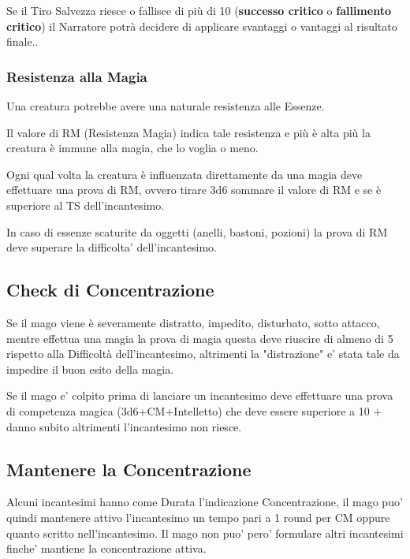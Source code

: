 \begin{multicols}{2}
Se il Tiro Salvezza riesce o fallisce di più di 10 (\textbf{successo critico} o \textbf{fallimento critico}) il Narratore potrà decidere di applicare svantaggi o vantaggi al risultato finale..

\subsubsection{Resistenza alla Magia}

Una creatura potrebbe avere una naturale resistenza alle Essenze.

Il valore di RM (Resistenza Magia) indica tale resistenza e più è alta più la creatura è immune alla magia, che lo voglia o meno.

Ogni qual volta la creatura è influenzata direttamente da una magia deve effettuare una prova di RM, ovvero tirare 3d6 sommare il valore di RM e se è superiore al TS dell'incantesimo.

In caso di essenze scaturite da oggetti (anelli, bastoni, pozioni) la prova di RM deve superare la difficolta' dell'incantesimo.

\subsection{Check di Concentrazione}

Se il mago viene è severamente distratto, impedito, disturbato, sotto attacco, mentre effettua una magia la prova di magia questa deve riuscire di almeno di 5 rispetto alla Difficoltà dell'incantesimo, altrimenti la "distrazione" e' stata tale da impedire il buon esito della magia.

Se il mago e' colpito prima di lanciare un incantesimo deve effettuare una prova di competenza magica (3d6+CM+Intelletto) che deve essere superiore a 10 + danno subito altrimenti l'incantesimo non riesce.

\subsection{Mantenere la Concentrazione}

Alcuni incantesimi hanno come Durata l'indicazione Concentrazione, il mago puo' quindi mantenere attivo l'incantesimo un tempo pari a 1 round per CM oppure quanto scritto nell'incantesimo.
Il mago non puo' pero' formulare altri incantesimi finche' mantiene la concentrazione attiva.


\end{multicols}
